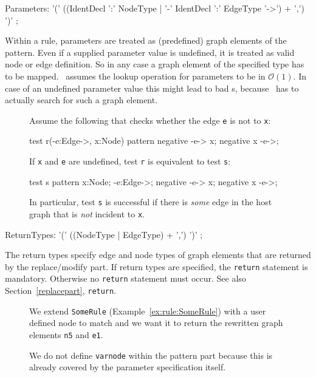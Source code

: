 \begin{rail}
  Parameters: '(' ((IdentDecl ':' NodeType | '-' IdentDecl ':' EdgeType '->') + ',') ')' ;
\end{rail}
Within a rule, parameters are treated as (predefined) graph elements of the pattern. Even if a supplied parameter value is undefined, it is treated as valid node or edge definition. So in any case a graph element of the specified type has to be mapped. \GrG\ assumes the lookup operation for parameters to be in $\mathcal{O}(1)$. In case of an undefined parameter value this might lead to bad s, because \GrG\ has to actually search for such a graph element.
\begin{figure}[htbp]
\begin{example}
Assume the following  that checks whether the edge \texttt{e} is not  to \texttt{x}:
\begin{grgen}
test r(-e:Edge->, x:Node) {
  pattern {
    negative {
      -e-> x;
    }
    negative {
      x -e->;
    }
  }
}
\end{grgen}
If \texttt{x} and \texttt{e} are undefined, test \texttt{r} is equivalent to test \texttt{s}:
\begin{grgen}
test s {
  pattern {
    x:Node;
    -e:Edge->;
    negative {
      -e-> x;
    }
    negative {
      x -e->;
    }
  }
}
\end{grgen}
In particular, test \texttt{s} is successful if there is \emph{some} edge in the host graph that is \emph{not} incident to \texttt{x}.
\end{example}
\end{figure}

\begin{rail}
  ReturnTypes: '(' ((NodeType | EdgeType) + ',') ')' ;
\end{rail}
The return types specify edge and node types of graph elements that are returned by the replace/modify part. If return types are specified, the \texttt{return} statement is mandatory. Otherwise no \texttt{return} statement must occur. See also Section~\ref{replacepart}, \texttt{return}.
\begin{figure}[htbp]
\begin{example}\label{ex:rule:someruleext}
We extend \texttt{SomeRule} (Example~\ref{ex:rule:SomeRule}) with a user defined node to match and we want it to return the rewritten graph elements \texttt{n5} and \texttt{e1}.
\begin{grgen}
  rule SomeRuleExt(varnode: Node): (Node, EdgeTypeB) {
    pattern {
      n1: NodeTypeA;
      ...
    }
    replace {
      varnode;
      ...  
      return(n5, e1);
      eval {
        ...
\end{grgen}
We do not define \texttt{varnode} within the pattern part because this is already covered by the parameter specification itself.
\end{example}
\end{figure}


